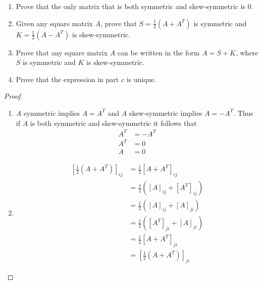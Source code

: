 \begin{exercise} \label{e1.4.36}
    \begin{enumerate}
        \item Prove that the only matrix that is both symmetric and skew-symmetric is \( 0 \).
        
        \item Given any square matrix \( A \), prove that \( S = \frac{1}{2}(A+A^T) \) is symmetric and \( K = \frac{1}{2}(A-A^T) \) is skew-symmetric.
        
        \item Prove that any square matrix \( A \) can be written in the form \( A = S + K \), where \( S \) is symmetric and \( K \) is skew-symmetric.
        
        \item Prove that the expression in part \( c \) is unique.
    \end{enumerate}
    
    \begin{proof}
        \begin{enumerate}
            \item \( A \) symmetric implies \( A = A^T \) and \( A \) skew-symmetric implies \( A = -A^T \). Thus if \( A \) is both symmetric and skew-symmetric it follows that
            \begin{align*}
                A^T &= -A^T \\
                A^T &= 0 \\
                A &= 0
            \end{align*}
            
            \item
            \begin{align*}
                \left[ \frac{1}{2}\left(A + A^T\right) \right]_{ij} &= \frac{1}{2}\left[ A + A^T \right]_{ij} \\
                &= \frac{1}{2} \left( [A]_{ij} + \left[A^T\right]_{ij} \right) \\
                &= \frac{1}{2} \left( [A]_{ij} + [A]_{ji} \right) \\
                &= \frac{1}{2} \left( [A^T]_{ji} + [A]_{ji} \right) \\
                &= \frac{1}{2} \left[A+A^T\right]_{ji} \\
                &= \left[ \frac{1}{2}\left(A+A^T\right) \right]_{ji}
            \end{align*}
            

\end{enumerate}
\end{proof}
\end{exercise}
